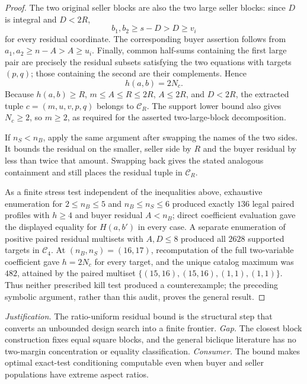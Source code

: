 \documentclass{article}
\begin{document}
\begin{proof}
The two original seller blocks are also the two large seller blocks: since \(D\) is integral and \(D<2R\),
\[
 b_1,b_2\ge s-D>D\ge v_i
\]
for every residual coordinate.  The corresponding buyer assertion follows from \(a_1,a_2\ge n-A>A\ge u_i\).  Finally, common half-sums containing the first large pair are precisely the residual subsets satisfying the two equations with targets \((p,q)\); those containing the second are their complements.  Hence
\[
 h(a,b)=2N_c.
\]
Because \(h(a,b)\ge R\), \(m\le A\le R\le2R\), \(A\le2R\), and \(D<2R\), the extracted tuple \(c=(m,u,v,p,q)\) belongs to \(\mathcal C_R\).  The support lower bound also gives \(N_c\ge2\), so \(m\ge2\), as required for the asserted two-large-block decomposition.

If \(n_S<n_B\), apply the same argument after swapping the names of the two sides.  It bounds the residual on the smaller, seller side by \(R\) and the buyer residual by less than twice that amount.  Swapping back gives the stated analogous containment and still places the residual tuple in \(\mathcal C_R\).

As a finite stress test independent of the inequalities above, exhaustive enumeration for \(2\le n_B\le5\) and \(n_B\le n_S\le6\) produced exactly \(136\) legal paired profiles with \(h\ge4\) and buyer residual \(A<n_B\); direct coefficient evaluation gave the displayed equality for \(H(a,b')\) in every case.  A separate enumeration of positive paired residual multisets with \(A,D\le8\) produced all \(2628\) supported targets in \(\mathcal C_4\).  At \((n_B,n_S)=(16,17)\), recomputation of the full two-variable coefficient gave \(h=2N_c\) for every target, and the unique catalog maximum was \(482\), attained by the paired multiset \(\{(15,16),(15,16),(1,1),(1,1)\}\).  Thus neither prescribed kill test produced a counterexample; the preceding symbolic argument, rather than this audit, proves the general result.
\end{proof}
\par\smallskip\noindent \textit{Justification.} The ratio-uniform residual bound is the structural step that converts an unbounded design search into a finite frontier. \textit{Gap.} The closest block construction fixes equal square blocks, and the general biclique literature has no two-margin concentration or equality classification. \textit{Consumer.} The bound makes optimal exact-test conditioning computable even when buyer and seller populations have extreme aspect ratios.
\end{document}
